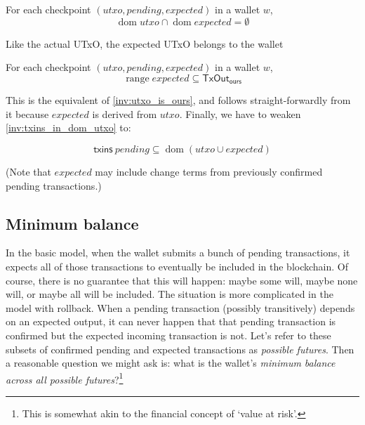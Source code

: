 \documentclass{article}
\DeclareMathOperator{\dom}{dom}
\DeclareMathOperator{\range}{range}
\theoremstyle{definition}{
  \newtheorem{lemma}{Lemma}[section] %
  \newtheorem{definition}[lemma]{Definition}
}
\theoremstyle{theorem}{
  \newtheorem{invariant}[lemma]{Invariant}
  \newtheorem{proofobligation}[lemma]{Proof Obligation}
}
\numberwithin{equation}{lemma}
\begin{document}
\begin{invariant}
For each checkpoint $(\mathit{utxo}, \mathit{pending}, \mathit{expected})$ in a wallet $w$,
\begin{equation*}
\dom \mathit{utxo} \cap \dom \mathit{expected} = \emptyset
\end{equation*}
\end{invariant}

Like the actual UTxO, the expected UTxO belongs to the wallet

\begin{invariant}
For each checkpoint $(\mathit{utxo}, \mathit{pending}, \mathit{expected})$ in a wallet $w$,
\begin{equation*}
\range \mathit{expected} \subseteq \mathsf{TxOut}_\mathsf{ours}
\end{equation*}
\end{invariant}

This is the equivalent of \cref{inv:utxo_is_ours}, and follows
straight-forwardly from it because $\mathit{expected}$ is derived from
$\mathit{utxo}$. Finally, we have to weaken
\cref{inv:txins_in_dom_utxo} to:

\begin{invariant}
\begin{equation*}
\mathsf{txins} ~ \mathit{pending} \subseteq \dom (\mathit{utxo} \cup \mathit{expected})
\end{equation*}
\label{inv:txins_in_dom_utxo_expected_pending}
\end{invariant}

(Note that $\mathit{expected}$ may include change terms from previously
confirmed pending transactions.)

\subsection{Minimum balance}

In the basic model, when the wallet submits a bunch of pending transactions, it
expects all of those transactions to eventually be included in the blockchain.
Of course, there is no guarantee that this will happen: maybe some will, maybe
none will, or maybe all will be included. The situation is more complicated in
the model with rollback. When a pending transaction (possibly transitively)
depends on an expected output, it can never happen that that pending transaction
is confirmed but the expected incoming transaction is not. Let's refer to these
subsets of confirmed pending and expected transactions as \emph{possible futures}.
Then a reasonable question we might ask is: what is the wallet's \emph{minimum
balance across all possible futures}?\footnote{This is somewhat akin to the
financial concept of `value at risk'.}
\end{document}
